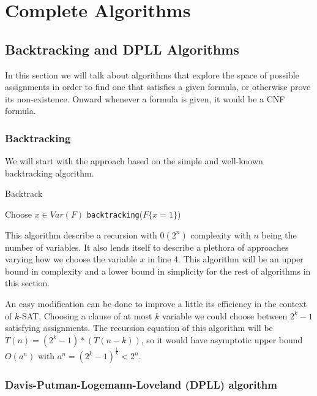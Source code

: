 

\chapter{Complete Algorithms}


\section{Backtracking and DPLL Algorithms}
\label{sec:dpll}
In this section we will talk about algorithms that explore the space of possible assignments in order to find one that satisfies a given formula, or otherwise prove its non-existence. Onward whenever a formula is given, it would be a CNF formula.

\subsection{Backtracking}
We  will start with the approach based on the simple and well-known backtracking algorithm.

\begin{algorithm}
  \caption{Backtrack}\label{bt}
  \begin{algorithmic}[1]
     
    \EndIf
     
    \EndIf
    \State Choose $x \in Var(F)$
     
    \EndIf
    \State \Return \texttt{backtracking}($F\{x=1\}$)
    \EndProcedure
  \end{algorithmic}
\end{algorithm}


This algorithm describe a recursion with $0(2^n)$ complexity with $n$ being the number of variables. It also lends itself to describe a plethora of approaches varying how we choose the variable $x$ in line 4. This algorithm will be an upper bound in complexity and a lower bound in simplicity for the rest of algorithms in this section.


An easy modification can be done to improve a little its efficiency in the context of $k$-SAT. Choosing a clause of at most $k$ variable we could choose between $2^k-1$ satisfying assignments. The recursion equation of this algorithm will be $T(n) = (2^k-1)*(T(n-k))$, so it would have asymptotic upper bound $O(a^n)$ with $a^n = (2^k-1)^{\frac{1}{k}}<2^n$.


\subsection{Davis-Putman-Logemann-Loveland (DPLL) algorithm}

